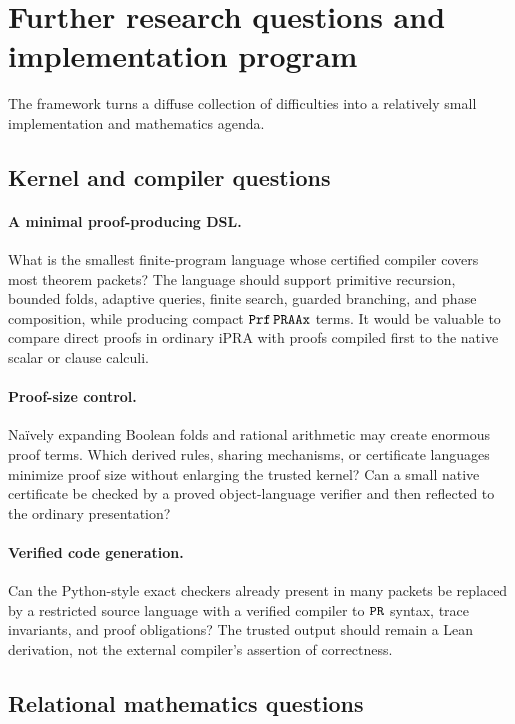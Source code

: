 \section{Further research questions and implementation program}
\label{sec:research}

The framework turns a diffuse collection of difficulties into a relatively
small implementation and mathematics agenda.

\subsection{Kernel and compiler questions}

\paragraph{A minimal proof-producing DSL.}
What is the smallest finite-program language whose certified compiler covers
most theorem packets?  The language should support primitive recursion,
bounded folds, adaptive queries, finite search, guarded branching, and phase
composition, while producing compact \(\texttt{Prf}\,\texttt{PRAAx}\) terms.  It would be
valuable to compare direct proofs in ordinary iPRA with proofs compiled first
to the native scalar or clause calculi.

\paragraph{Proof-size control.}
Na\"ively expanding Boolean folds and rational arithmetic may create enormous
proof terms.  Which derived rules, sharing mechanisms, or certificate
languages minimize proof size without enlarging the trusted kernel?  Can a
small native certificate be checked by a proved object-language verifier and
then reflected to the ordinary presentation?

\paragraph{Verified code generation.}
Can the Python-style exact checkers already present in many packets be replaced
by a restricted source language with a verified compiler to \(\texttt{PR}\) syntax,
trace invariants, and proof obligations?  The trusted output should remain a
Lean derivation, not the external compiler's assertion of correctness.

\subsection{Relational mathematics questions}

